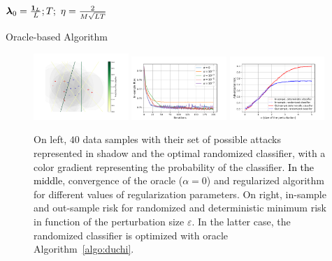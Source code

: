 \begin{algorithm}[ht]
\SetAlgoLined
 $\bm{\lambda}_0 = \frac{\mathbf{1}_L}{L}; T;~\textcolor{black}{\eta=\frac{2}{M\sqrt{LT}}}$\\
 \caption{Oracle-based Algorithm}
 \label{algo:duchi}
\end{algorithm}
\begin{figure}[!ht]
    \centering
    \includegraphics[width=0.32\textwidth]{Images/illustration.pdf}  \includegraphics[width=0.32\textwidth]{Images/convergence_toy.pdf}     \includegraphics[width=0.32\textwidth]{Images/risk_toy.pdf}
    \caption{On left, $40$ data samples with their set of possible attacks represented in shadow and the optimal randomized classifier, with a color gradient representing the probability of the classifier. \textcolor{black}{In the middle}, convergence of the oracle ($\alpha=0$) and regularized algorithm for different values of regularization parameters. On right, in-sample and out-sample risk for randomized and deterministic minimum risk in function of the perturbation size $\varepsilon$. In the latter case, the randomized classifier is optimized with oracle Algorithm~\ref{algo:duchi}.}
    \label{fig:toy_example}
\end{figure}


